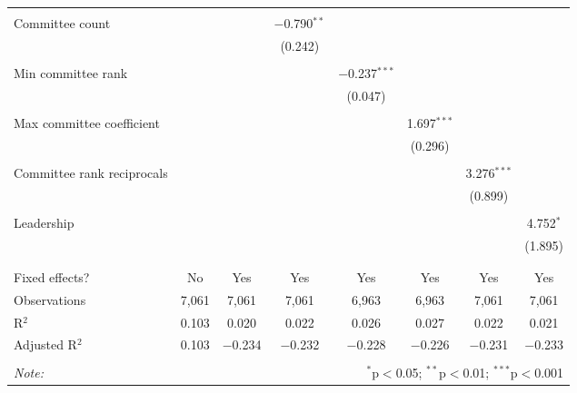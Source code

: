 \documentclass{article}
\begin{document}
\begin{table}[!htbp]
{{\begin{tabular}{@{\extracolsep{5pt}}lccccccc}
          & & & & & & & \\ 
         Committee count &  &  & $-$0.790$^{**}$ &  &  &  &  \\ 
          &  &  & (0.242) &  &  &  &  \\ 
          & & & & & & & \\ 
         Min committee rank &  &  &  & $-$0.237$^{***}$ &  &  &  \\ 
          &  &  &  & (0.047) &  &  &  \\ 
          & & & & & & & \\ 
         Max committee coefficient &  &  &  &  & 1.697$^{***}$ &  &  \\ 
          &  &  &  &  & (0.296) &  &  \\ 
          & & & & & & & \\ 
         Committee rank reciprocals &  &  &  &  &  & 3.276$^{***}$ &  \\ 
          &  &  &  &  &  & (0.899) &  \\ 
          & & & & & & & \\ 
         Leadership &  &  &  &  &  &  & 4.752$^{*}$ \\ 
          &  &  &  &  &  &  & (1.895) \\ 
          & & & & & & & \\ 
        \hline \\[-1.8ex] 
        Fixed effects? & No & Yes & Yes & Yes & Yes & Yes & Yes \\ 
        Observations & 7,061 & 7,061 & 7,061 & 6,963 & 6,963 & 7,061 & 7,061 \\ 
        R$^{2}$ & 0.103 & 0.020 & 0.022 & 0.026 & 0.027 & 0.022 & 0.021 \\ 
        Adjusted R$^{2}$ & 0.103 & $-$0.234 & $-$0.232 & $-$0.228 & $-$0.226 & $-$0.231 & $-$0.233 \\ 
        \hline 
        \hline \\[-1.8ex] 
        \textit{Note:}  & \multicolumn{7}{r}{$^{*}$p$<$0.05; $^{**}$p$<$0.01; $^{***}$p$<$0.001} \\ 
        \end{tabular} 
    }}
  \end{table} 
\end{document}
